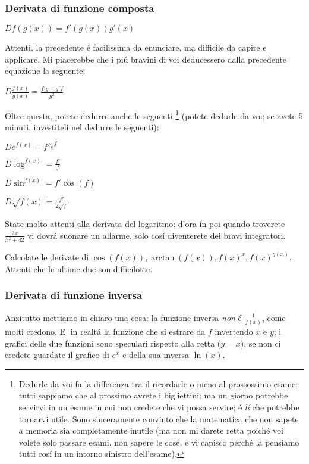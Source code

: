 \subsubsection{Derivata di funzione composta}
$D f(g(x)) = f'(g(x))g'(x)$

Attenti, la precedente \'e facilissima da enunciare, ma difficile da capire e applicare. Mi piacerebbe che i pi\'u bravini di voi deducessero dalla precedente equazione la seguente: 

$D \frac{f(x)}{g(x)} = \frac{f'g-g'f}{g^2}$

Oltre questa, potete dedurre anche le seguenti \footnote{Dedurle da voi fa la differenza tra il ricordarle o meno al prossossimo esame:
tutti sappiamo che al prossimo avrete i bigliettini; ma un giorno potrebbe servirvi in un esame in cui non credete che vi possa servire;
\'e {\em l\'i} che potrebbe tornarvi utile. Sono sinceramente convinto che la matematica che non sapete a memoria sia completamente inutile
(ma non mi darete retta poich\'e voi volete solo passare esami, non sapere le cose, e vi capisco perch\'e la pensiamo tutti cos\'i in un
intorno sinistro dell'esame).} (potete dedurle da voi; se avete 5 minuti, investiteli nel dedurre le seguenti):

$D e^{f(x)} = f' \dot e^f$

$D \log^{f(x)} = \frac{f'}{f} $

$D \sin^{f(x)} = f' \dot \cos(f)$

$D \sqrt{f(x)} = \frac{f'}{2\sqrt{f}}$

State molto attenti alla derivata del logaritmo: d'ora in poi quando troverete $\frac{2x}{x^2+42}$ vi
dovr\'a suonare un allarme, solo cos\'i diventerete dei bravi integratori.

\begin{esercizio}
Calcolate le derivate di $\cos(f(x)),\arctan(f(x)),f(x)^x,f(x)^{g(x)}$. Attenti che le ultime due son difficilotte.
\end{esercizio}

\subsubsection{Derivata di funzione inversa}

Anzitutto mettiamo in chiaro una cosa: la funzione inversa {\em non} \'e $\frac{1}{f(x)}$, come molti credono.
E' in realt\'a la funzione che si estrare da $f$ invertendo $x$ e $y$; i grafici delle due funzioni sono speculari rispetto alla retta ($y=x$), se non ci credete guardate il grafico di $e^x$ e della sua inversa $\ln(x)$.

